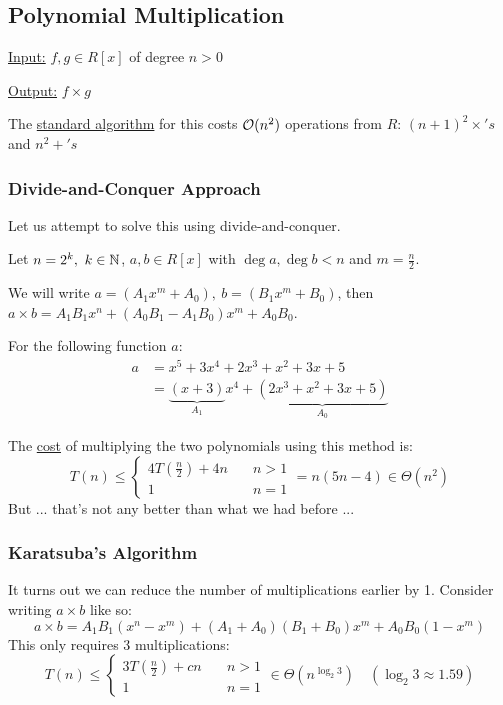 \subsection{Polynomial Multiplication}
\ul{Input:} $f,g \in R[x]$ of degree $n > 0$

\ul{Output:} $f \times g$

The \ul{standard algorithm} for this costs $\operatorname{\mathcal{O}}(n^2)$ operations from $R$: $(n + 1)^2 \times's$ and $n^2 +'s$

\subsubsection{Divide-and-Conquer Approach}
Let us attempt to solve this using divide-and-conquer.

Let $n = 2^k, \ k \in \operatorname{\mathbb{N}}$, $a,b \in R[x]$ with $\deg a, \deg b < n$ and $m = \frac{n}{2}$.

We will write $a = (A_1x^m + A_0), \ b = (B_1x^m + B_0)$, then $a \times b = A_1B_1x^n + (A_0B_1 - A_1B_0)x^m + A_0B_0$.

\begin{example}{}{}
    For the following function $a$:
    \begin{align*}
        a &= x^5 + 3x^4 + 2x^3 + x^2 + 3x + 5 \\
        &= \underbrace{(x+3)}_{A_1}x^4 + 
        \underbrace{(2x^3 + x^2 + 3x + 5)}_{A_0}
    \end{align*}
\end{example}

The \ul{cost} of multiplying the two polynomials using this method is:
\begin{equation}
    T(n) \leq
    \begin{cases}
        4T\left(\frac{n}{2}\right) + 4n \quad & n > 1 \\
        1 \quad & n = 1
    \end{cases}
    = n(5n - 4) \in \Theta(n^2)
\end{equation}
But ... that's not any better than what we had before ...

\subsubsection{Karatsuba's Algorithm}
It turns out we can reduce the number of multiplications earlier by 1.
Consider writing $a \times b$ like so:
\begin{equation}
    a \times b = A_1B_1(x^n - x^m) + (A_1 + A_0)(B_1 + B_0)x^m + A_0B_0(1 - x^m)
\end{equation}
This only requires $3$ multiplications:
\begin{equation}
    T(n) \leq
    \begin{cases}
        3T\left(\frac{n}{2}\right) + cn \quad & n > 1 \\
        1 \quad & n = 1
    \end{cases}
    \in \Theta(n^{\log_2 3}) \quad (\log_2 3 \approx 1.59)
\end{equation}

